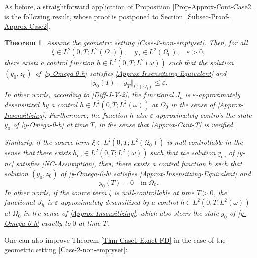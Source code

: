 \documentclass[11pt]{article}
\numberwithin{equation}{section}
\newcommand{\nc}{\mathrm{nc}}
\newcommand{\norm}[1]{\Vert#1\Vert}
\newtheorem{theorem}{Theorem}[section]
\theoremstyle{definition}
\begin{document}
As before, a straightforward application of Proposition \ref{Prop-Approx-Cont-Case2} is the following result, whose proof is postponed to Section~\ref{Subsec-Proof-Approx-Case2}.

\begin{theorem}
\label{Thm-Approx-Case2}
Assume the geometric setting \eqref{Case-2-non-emptyset}. Then, for all
\[
\xi \in L^2(0,T; L^2(\Omega_0)), \quad y_T \in L^2(\Omega_0),\quad\varepsilon >0,
\]
there exists a control function $h\!\!\in\!L^2(0,T; L^2(\omega))$ such that the solution $(y_0,z_0)$~of~\eqref{y-Omega-0-h} satisfies \eqref{Approx-Insensitzing-Equivalent} and
\begin{equation}
\label{Approx-Cont-T}
\norm{y_0(T) - y_T}_{L^2(\Omega_0)} \leq \varepsilon.
\end{equation}
In other words, according to \eqref{Diff-J-V-2}, the functional $J_h$ is $\varepsilon$-approximately desensitized by a control $h \in L^2(0,T; L^2(\omega))$ at $\Omega_0$ in the sense of \eqref{Approx-Insensitizing}. Furthermore, the function $h$ also $\varepsilon$-approximately controls the state $y_0$ of \eqref{y-Omega-0-h} at time $T$, in the sense that \eqref{Approx-Cont-T} is verified.

Similarly, if {the source term} $\xi \in L^2(0,T; L^2(\Omega_0))$ is null-controllable in the sense that there exists $h_{\nc} \in L^2(0,T; L^2(\omega))$ such that the solution $y_{\nc}$ of \eqref{y-nc} satisfies \eqref{NC-Assumption}, then, there exists a control function $h$ such that solution $(y_0,z_0)$ of \eqref{y-Omega-0-h} satisfies \eqref{Approx-Insensitzing-Equivalent} and
\begin{equation}
\label{NC-and-Approx-Insenstizing}
y_0(T) = 0 \quad\text{in } \Omega_0.
\end{equation}
In other words, if {the source term} $\xi$ is null-controllable at time $T>0$, the functional~$J_h$ is $\varepsilon$-approximately desensitized by a control $h \in L^2(0,T; L^2(\omega))$ at $\Omega_0$ in the sense of \eqref{Approx-Insensitizing}, which also steers the state $y_0$ of \eqref{y-Omega-0-h} exactly to $0$ at time $T$.
\end{theorem}

One can also improve Theorem \ref{Thm-Case1-Exact-FD} in the case of the geometric setting \eqref{Case-2-non-emptyset}:
\end{document}

